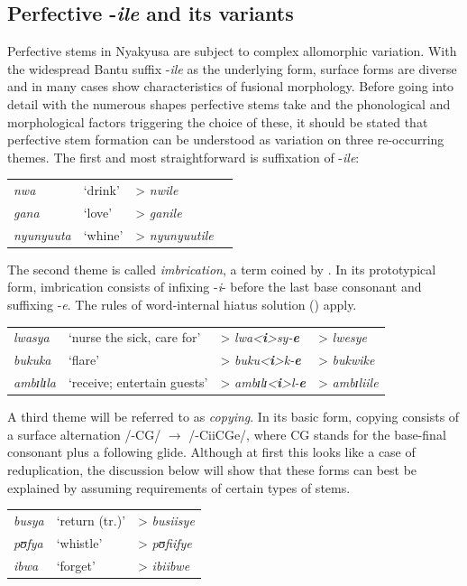 \subsection{Perfective -\textit{ile} and its variants}\label{Imbrication} 
Perfective stems in Nyakyusa are subject to complex allomorphic variation. With the widespread Bantu suffix -\textit{ile} as the underlying form, surface forms are diverse and in many cases show characteristics of fusional morphology. Before going into detail with the numerous shapes perfective stems take and the phonological and morphological factors triggering the choice of these, it should be stated that perfective stem formation can be understood as variation on three re-occurring themes. The first and most straightforward is suffixation of -\textit{ile}:
\begin{exe}
\ex
\begin{tabular}[t]{@{}>{\itshape}llll}
\textit{nwa}&`drink'& > \textit{nwile}
\\\textit{gana}&`love'& > \textit{ganile}
\\\textit{nyunyuuta}&`whine'& > \textit{nyunyuutile}
\end{tabular}
\end{exe} 
The second theme is called \textit{imbrication}, a term coined by \citet{BastinY1983}. In its prototypical form, imbrication consists of infixing -\textit{i}- before the last base consonant and suffixing -\textit{e}. The rules of word-internal hiatus solution () apply.
\begin{exe}
\ex
\begin{tabular}[t]{@{}>{\itshape}llll}
\textit{lwasya}&`nurse the sick, care for'& > \textit{lwa<\textbf{i}>sy-\textbf{e}}& > \textit{lwesye}
\\\textit{bukuka}&`flare'& > \textit{buku<\textbf{i}>k-\textbf{e}} & > \textit{bukwike}
\\\textit{ambɪlɪla}&`receive; entertain guests'& > \textit{ambɪlɪ<\textbf{i}>l-\textbf{e}}& > \textit{ambɪliile}
\end{tabular}
\end{exe} 
A third theme will be referred to as \textit{copying}. In its basic form, copying consists of a surface alternation /-CG/ $\rightarrow$ /-CiiCGe/, where CG stands for the base-final consonant plus a following glide. Although at first this looks like a case of reduplication, the discussion below will show that these forms can best be explained by assuming  requirements of certain types of stems.
\begin{exe}
\ex
\begin{tabular}[t]{@{}>{\itshape}lll}
\textit{busya}&`return (tr.)'& > \textit{busiisye}
\\\textit{pʊfya}&`whistle'& > \textit{pʊfiifye}
\\\textit{ibwa}&`forget'& > \textit{ibiibwe}
\end{tabular}
\end{exe}

